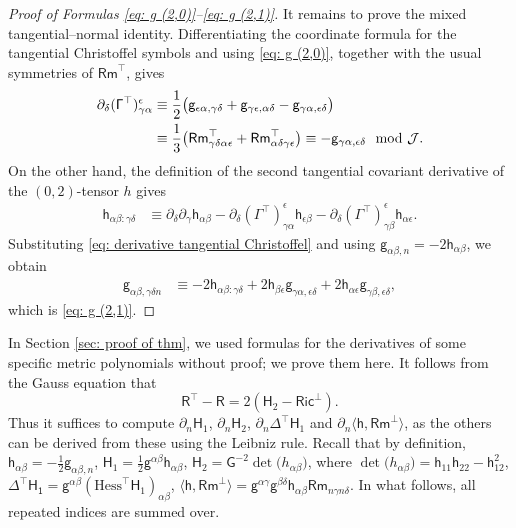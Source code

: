 \documentclass[11pt]{amsart}
\theoremstyle{definition}
\numberwithin{equation}{section}
\begin{document}
\begin{proof}[Proof of Formulas \eqref{eq: g (2,0)}--\eqref{eq: g (2,1)}]
    It remains to prove the mixed tangential--normal identity.  Differentiating the coordinate formula for the tangential Christoffel symbols and using \eqref{eq: g (2,0)}, together with the usual symmetries of $\mathsf{Rm}^\top$, gives
    \begin{align}
        \partial_\delta(\mathsf \Gamma^\top)_{\gamma\alpha}^{\epsilon}
        &\equiv \frac12\bigl(
        \mathsf g_{\epsilon\alpha,\gamma\delta}
        +\mathsf g_{\gamma\epsilon,\alpha\delta}
        -\mathsf g_{\gamma\alpha,\epsilon\delta}\bigr)\notag\\
        &\equiv \frac13\bigl(
        \mathsf {Rm}^\top_{\gamma\delta\alpha\epsilon}
        +\mathsf {Rm}^\top_{\alpha\delta\gamma\epsilon}\bigr)
        \equiv-\mathsf g_{\gamma\alpha,\epsilon\delta}\mod\mathcal J.
        \label{eq: derivative tangential Christoffel}
    \end{align}
    On the other hand, the definition of the second tangential covariant derivative of the $(0,2)$-tensor $h$ gives
    \begin{align*}
        \mathsf h_{\alpha\beta:\gamma\delta}
        &\equiv \partial_\delta\partial_\gamma \mathsf h_{\alpha\beta}
        -\partial_\delta(\mathsf \Gamma^\top)_{\gamma\alpha}^{\epsilon}\mathsf h_{\epsilon\beta}
        -\partial_\delta(\mathsf \Gamma^\top)_{\gamma\beta}^{\epsilon}\mathsf h_{\alpha\epsilon}.
    \end{align*}
    Substituting \eqref{eq: derivative tangential Christoffel} and using
    $\mathsf g_{\alpha\beta,n}=-2\mathsf h_{\alpha\beta}$, we obtain
    \begin{align*}
        \mathsf g_{\alpha\beta,\gamma\delta n}
        &\equiv-2\mathsf h_{\alpha\beta:\gamma\delta}
        +2\mathsf h_{\beta\epsilon}\mathsf g_{\gamma\alpha,\epsilon\delta}
        +2\mathsf h_{\alpha\epsilon}\mathsf g_{\gamma\beta,\epsilon\delta},
    \end{align*}
    which is \eqref{eq: g (2,1)}.  
\end{proof}


In Section \ref{sec: proof of thm}, we used formulas for the derivatives of some specific metric polynomials without proof; we prove them here. It follows from the Gauss equation that 
\[\mathsf R^\top - \mathsf R = 2(\mathsf H_2 - \mathsf{Ric}^\bot).\]
Thus it suffices to compute $\partial_n\mathsf H_1$, $\partial_n\mathsf H_2$, $\partial_n\mathsf\Delta^\top\mathsf H_1$ and $\partial_n\langle\mathsf h, \mathsf{Rm}^\bot\rangle$, as the others can be derived from these using the Leibniz rule. Recall that by definition, $\mathsf h_{\alpha\beta} = -\frac{1}{2}\mathsf g_{\alpha\beta,n}$, $\mathsf H_1 = \frac{1}{2}\mathsf g^{\alpha\beta}\mathsf h_{\alpha\beta}$, $\mathsf H_2 = \mathsf G^{-2}\det\mathsf(h_{\alpha\beta})$, where $\det\mathsf(h_{\alpha\beta}) = \mathsf h_{11}\mathsf h_{22} - \mathsf h_{12}^2$, $\mathsf{\Delta^\top H_1} = \mathsf g^{\alpha\beta}(\mathrm{Hess}^\top \mathsf H_1)_{\alpha\beta}$, $\langle\mathsf h, \mathsf{Rm}^\bot\rangle = \mathsf g^{\alpha\gamma}\mathsf g^{\beta\delta}\mathsf h_{\alpha\beta}\mathsf{Rm}_{n\gamma n\delta}$. In what follows, all repeated indices are summed over.
\end{document}
